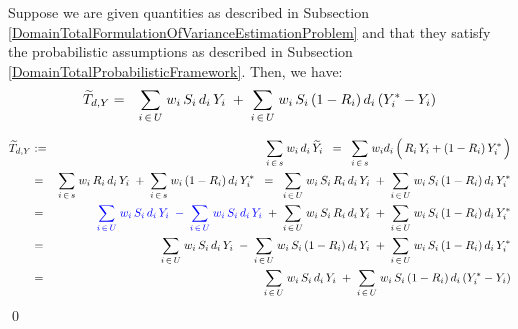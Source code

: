 
\vskip 0.1cm
\begin{lemma}
\mbox{}
\vskip 0.1cm
\noindent
Suppose we are given quantities as described in Subsection
\ref{DomainTotalFormulationOfVarianceEstimationProblem}
and
that they satisfy the probabilistic assumptions as described in Subsection
\ref{DomainTotalProbabilisticFramework}.
\vskip 0.1cm
\noindent
Then, we have:
\begin{eqnarray*}
\widetilde{T}_{d,Y}
& = &
    \underset{i\,\in\,U}{\sum}\;w_{i}\,S_{i}\,d_{i}\,Y_{i}
    \;\overset{{\color{white}.}}{+}\;
    \underset{i\,\in\,U}{\sum}\;w_{i}\,S_{i}\,(1-R_{i})\,d_{i}\,(Y^{*}_{i}-Y_{i})
\end{eqnarray*}
\end{lemma}
\proof
\begin{eqnarray*}
\widetilde{T}_{d,Y}
& := &
    \underset{i\,\in\,s}{\sum}\;w_{i}\,d_{i}\,\widetilde{Y}_{i}
\;\; = \;\;
    \underset{i\,\in\,s}{\sum}\;w_{i}d_{i}\left(\,
        R_{i}\,Y_{i}
        \overset{{\color{white}.}}{+}
        (1-R_{i})\,Y^{*}_{i}
        \,\right)
\\
& = &
    \underset{i\,\in\,s}{\sum}\;w_{i}\,R_{i}\,d_{i}\,Y_{i}
    \;\overset{{\color{white}.}}{+}\;
    \underset{i\,\in\,s}{\sum}\;w_{i}\,(1-R_{i})\,d_{i}\,Y^{*}_{i}
\;\; = \;\;
    \underset{i\,\in\,U}{\sum}\;w_{i}\,S_{i}\,R_{i}\,d_{i}\,Y_{i}
    \;\overset{{\color{white}.}}{+}\;
    \underset{i\,\in\,U}{\sum}\;w_{i}\,S_{i}\,(1-R_{i})\,d_{i}\,Y^{*}_{i}
\\
& = &
    {\color{blue}
    \underset{i\,\in\,U}{\sum}\;w_{i}\,S_{i}\,d_{i}\,Y_{i}
    \;\overset{{\color{white}.}}{-}\;
    \underset{i\,\in\,U}{\sum}\;w_{i}\,S_{i}\,d_{i}\,Y_{i}
    }
    \;\overset{{\color{white}.}}{+}\;
    \underset{i\,\in\,U}{\sum}\;w_{i}\,S_{i}\,R_{i}\,d_{i}\,Y_{i}
    \;\overset{{\color{white}.}}{+}\;
    \underset{i\,\in\,U}{\sum}\;w_{i}\,S_{i}\,(1-R_{i})\,d_{i}\,Y^{*}_{i}
\\
& = &
    \underset{i\,\in\,U}{\sum}\;w_{i}\,S_{i}\,d_{i}\,Y_{i}
    \;\overset{{\color{white}.}}{-}\;
    \underset{i\,\in\,U}{\sum}\;w_{i}\,S_{i}\,(1-R_{i})\,d_{i}\,Y_{i}
    \;\overset{{\color{white}.}}{+}\;
    \underset{i\,\in\,U}{\sum}\;w_{i}\,S_{i}\,(1-R_{i})\,d_{i}\,Y^{*}_{i}
\\
& = &
    \underset{i\,\in\,U}{\sum}\;w_{i}\,S_{i}\,d_{i}\,Y_{i}
    \;\overset{{\color{white}.}}{+}\;
    \underset{i\,\in\,U}{\sum}\;w_{i}\,S_{i}\,(1-R_{i})\,d_{i}\,(Y^{*}_{i}-Y_{i})
\end{eqnarray*}
\vskip -0.5cm
\qed

